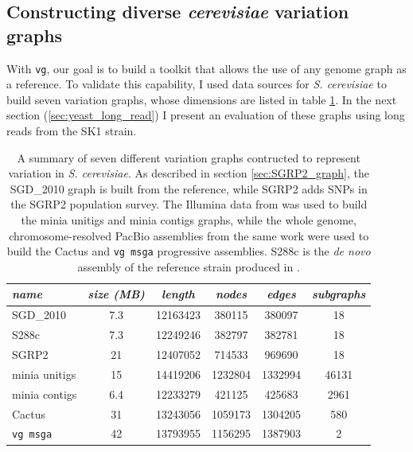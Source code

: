 \subsection{Constructing diverse \emph{cerevisiae} variation graphs}
\label{sec:constructing_yeast_graphs}

With {\tt vg}, our goal is to build a toolkit that allows the use of any genome graph as a reference.
To validate this capability, I used data sources for \emph{S. cerevisiae} to build seven variation graphs, whose dimensions are listed in table \ref{table:yeast_graphs}.
In the next section (\ref{sec:yeast_long_read}) I present an evaluation of these graphs using long reads from the SK1 strain.


\begin{table}[h]
  \centering
\begin{tabular}{l||c|c|c|c|c}
\itshape name & \itshape size (MB) & \itshape length & \itshape nodes & \itshape edges & \itshape subgraphs \\
\hline
SGD\_2010 & 7.3 & 12163423 & 380115 & 380097 & 18 \\
S288c & 7.3 & 12249246 & 382797 & 382781 & 18 \\
SGRP2 & 21 & 12407052 & 714533 & 969690 & 18 \\
minia unitigs & 15 & 14419206 & 1232804 & 1332994 & 46131 \\
minia contigs & 6.4 & 12233279 & 421125 & 425683 & 2961 \\
Cactus & 31 & 13243056 & 1059173 & 1304205 & 580 \\
{\tt vg msga} & 42 & 13793955 & 1156295 & 1387903 & 2 \\
\hline
\end{tabular}
\caption[\emph{S. cerevisiae} variation graphs]{
  A summary of seven different variation graphs contructed to represent variation in \emph{S. cerevisiae}.
  As described in section \ref{sec:SGRP2_graph}, the SGD\_2010 graph is built from the reference, while SGRP2 adds SNPs in the SGRP2 population survey.
  The Illumina data from \cite{yue2017contrasting} was used to build the minia unitigs and minia contigs graphs, while the whole genome, chromosome-resolved PacBio assemblies from the same work were used to build the Cactus and {\tt vg msga} progressive assemblies.
  S288c is the \emph{de novo} assembly of the reference strain produced in \cite{yue2017contrasting}.
}
\label{table:yeast_graphs}
\end{table}

